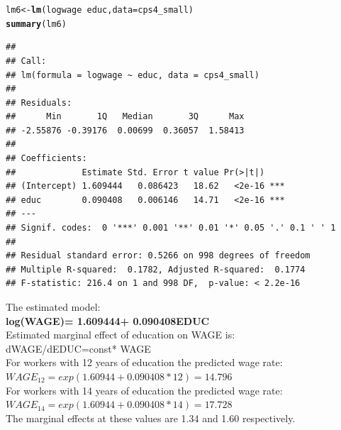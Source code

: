 \documentclass[a4paper]{article}\usepackage[]{graphicx}\usepackage[]{color}
\makeatletter
\newcommand{\hlopt}[1]{\textcolor[rgb]{0,0,0}{#1}}%
\newcommand{\hlstd}[1]{\textcolor[rgb]{0.345,0.345,0.345}{#1}}%
\newcommand{\hlkwb}[1]{\textcolor[rgb]{0.69,0.353,0.396}{#1}}%
\newcommand{\hlkwc}[1]{\textcolor[rgb]{0.333,0.667,0.333}{#1}}%
\newcommand{\hlkwd}[1]{\textcolor[rgb]{0.737,0.353,0.396}{\textbf{#1}}}%
\newenvironment{kframe}{%
 \def\at@end@of@kframe{}%
 \ifinner\ifhmode%
  \def\at@end@of@kframe{\end{minipage}}%
  \begin{minipage}{\columnwidth}%
 \fi\fi%
 \def\FrameCommand##1{\hskip\@totalleftmargin \hskip-\fboxsep
 \colorbox{shadecolor}{##1}\hskip-\fboxsep
     \hskip-\linewidth \hskip-\@totalleftmargin \hskip\columnwidth}%
 \MakeFramed {\advance\hsize-\width
   \@totalleftmargin\z@ \linewidth\hsize
   \@setminipage}}%
 {\par\unskip\endMakeFramed%
 \at@end@of@kframe}
\newenvironment{knitrout}{}{} %
\makeatother
\begin{document}
\begin{knitrout}
\color{fgcolor}\begin{kframe}
\begin{alltt}
\hlstd{lm6} \hlkwb{<-} \hlkwd{lm}\hlstd{(logwage}\hlopt{~}\hlstd{educ ,} \hlkwc{data}\hlstd{= cps4_small)}
\hlkwd{summary}\hlstd{(lm6)}
\end{alltt}
\begin{verbatim}
## 
## Call:
## lm(formula = logwage ~ educ, data = cps4_small)
## 
## Residuals:
##      Min       1Q   Median       3Q      Max 
## -2.55876 -0.39176  0.00699  0.36057  1.58413 
## 
## Coefficients:
##             Estimate Std. Error t value Pr(>|t|)    
## (Intercept) 1.609444   0.086423   18.62   <2e-16 ***
## educ        0.090408   0.006146   14.71   <2e-16 ***
## ---
## Signif. codes:  0 '***' 0.001 '**' 0.01 '*' 0.05 '.' 0.1 ' ' 1
## 
## Residual standard error: 0.5266 on 998 degrees of freedom
## Multiple R-squared:  0.1782,	Adjusted R-squared:  0.1774 
## F-statistic: 216.4 on 1 and 998 DF,  p-value: < 2.2e-16
\end{verbatim}
\end{kframe}
\end{knitrout}

The estimated model:\\

\textbf{log(WAGE)= 1.609444+ 0.090408EDUC}\\

Estimated marginal effect of education on WAGE is:\\

dWAGE/dEDUC=const* WAGE\\

For workers with 12  years of education the predicted wage rate:\\

$WAGE_12=exp(1.60944 + 0.090408* 12)= 14.796$\\

For workers with 14  years of education the predicted wage rate:\\

$WAGE_14=exp(1.60944 + 0.090408* 14)= 17.728$\\

The marginal effects at these values are 1.34 and 1.60 respectively.\\
\end{document}
